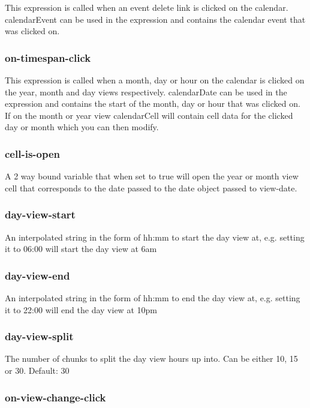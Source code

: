 This expression is called when an event delete link is clicked on the calendar. {\ttfamily calendar\+Event} can be used in the expression and contains the calendar event that was clicked on.

\subsubsection*{on-\/timespan-\/click}

This expression is called when a month, day or hour on the calendar is clicked on the year, month and day views respectively. {\ttfamily calendar\+Date} can be used in the expression and contains the start of the month, day or hour that was clicked on. If on the month or year view {\ttfamily calendar\+Cell} will contain cell data for the clicked day or month which you can then modify.

\subsubsection*{cell-\/is-\/open}

A 2 way bound variable that when set to true will open the year or month view cell that corresponds to the date passed to the date object passed to {\ttfamily view-\/date}.

\subsubsection*{day-\/view-\/start}

An interpolated string in the form of hh\+:mm to start the day view at, e.\+g. setting it to 06\+:00 will start the day view at 6am

\subsubsection*{day-\/view-\/end}

An interpolated string in the form of hh\+:mm to end the day view at, e.\+g. setting it to 22\+:00 will end the day view at 10pm

\subsubsection*{day-\/view-\/split}

The number of chunks to split the day view hours up into. Can be either 10, 15 or 30. Default\+: 30

\subsubsection*{on-\/view-\/change-\/click}

